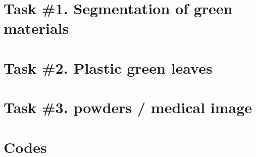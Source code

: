 \section{Task \#1. Segmentation of green materials}






\section{Task \#2. Plastic green leaves}





\section{Task \#3. powders / medical image}




\section{Codes}




